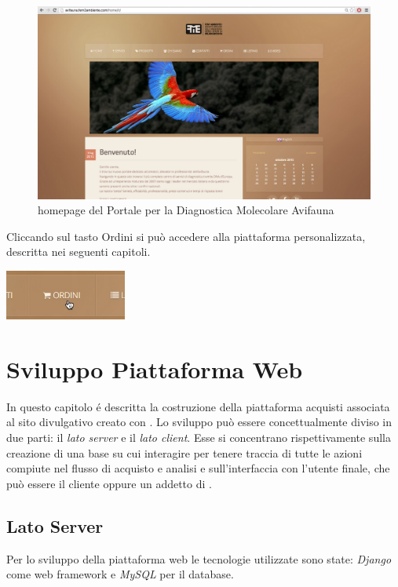 \begin{figure}
\includegraphics[width=1\textwidth]{images/homepage} 
\caption{homepage del Portale per la Diagnostica Molecolare Avifauna}
\label{fig:homepage}
\end{figure}

Cliccando sul tasto \textsf{Ordini} si può accedere alla piattaforma personalizzata, descritta nei seguenti capitoli.

\begin{center}
\includegraphics[width=0.3\textwidth]{images/homepage-ordini} 
\label{fig:homepage-ordini}
\end{center}

\chapter{Sviluppo Piattaforma Web}
\label{chp:sviluppo}
In questo capitolo é descritta la costruzione della piattaforma acquisti associata al sito divulgativo creato con {\wp}. Lo sviluppo può essere concettualmente diviso in due parti: il \emph{lato server} e il \emph{lato client}. Esse si concentrano rispettivamente sulla creazione di una base su cui interagire per tenere traccia di tutte le azioni compiute nel flusso di acquisto e analisi e sull'interfaccia con l'utente finale, che può essere il cliente oppure un addetto di {\fem}.

\section{Lato Server}
\label{sec:server}
Per lo sviluppo della piattaforma web le tecnologie utilizzate sono state: \emph{Django} come web framework e \emph{MySQL} per il database.

